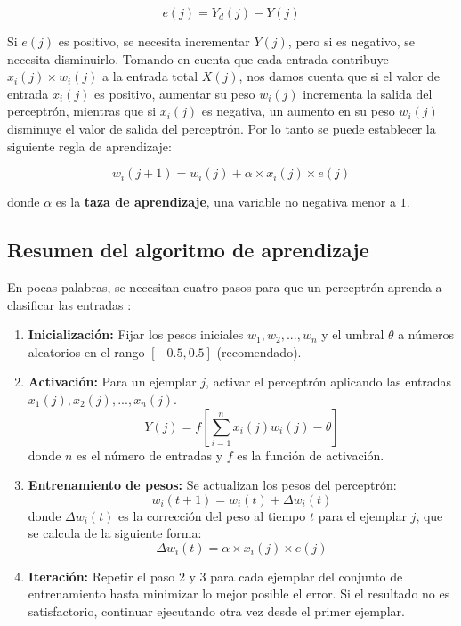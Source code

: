 \[ e(j) = Y_d(j)-Y(j)\]
\parencite[171]{Nengnevitsky2005}

Si $e(j)$ es positivo, se necesita incrementar $Y(j)$, pero si es negativo, se necesita disminuirlo. Tomando en cuenta que cada entrada contribuye \(x_i(j) \times w_i(j)\) a la entrada total $X(j)$, nos damos cuenta que si el valor de entrada $x_i(j)$ es positivo, aumentar su peso $w_i(j)$ incrementa la salida del perceptrón, mientras que si $x_i(j)$ es negativa, un aumento en su peso $w_i(j)$ disminuye el valor de salida del perceptrón. Por lo tanto se puede establecer la siguiente regla de aprendizaje:

\[w_i(j+1) = w_i(j) + \alpha \times x_i(j) \times e(j) \]
\parencite[171]{Nengnevitsky2005}

\noindent donde $\alpha$ es la \textbf{taza de aprendizaje}, una variable no negativa menor a $1$.

\subsection{Resumen del algoritmo de aprendizaje}

\noindent En pocas palabras, se necesitan cuatro pasos para que un perceptrón aprenda a clasificar las entradas \parencite[172]{Nengnevitsky2005}:\par

\begin{enumerate}
  \item \textbf{Inicialización:} Fijar los pesos iniciales \(w_1, w_2, ..., w_n\) y el umbral $\theta$ a números aleatorios en el rango $[-0.5, 0.5]$ (recomendado).
  \item \textbf{Activación:} Para un ejemplar $j$, activar el perceptrón aplicando las entradas\\ \(x_1(j), x_2(j), ..., x_n(j)\).
  \[Y(j) = f\left[\sum_{i=1}^{n}x_i(j)w_i(j)-\theta\right]\]
  donde $n$ es el número de entradas y $f$ es la función de activación.
  \item \textbf{Entrenamiento de pesos:} Se actualizan los pesos del perceptrón:
  \[w_i(t+1)=w_i(t)+\Delta w_i(t)\]
  donde \(\Delta w_i(t)\) es la corrección del peso al tiempo $t$ para el ejemplar $j$, que se calcula de la siguiente forma:
  \[\Delta w_i(t)=\alpha \times x_i(j) \times e(j)\]
  \item \textbf{Iteración:} Repetir el paso 2 y 3 para cada ejemplar del conjunto de entrenamiento hasta minimizar lo mejor posible el error. Si el resultado no es satisfactorio, continuar ejecutando otra vez desde el primer ejemplar.
  \label{algo:b}
\end{enumerate}

